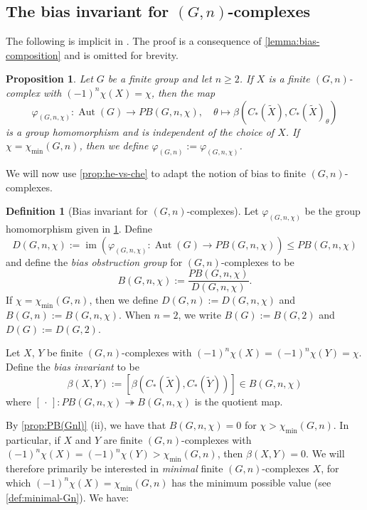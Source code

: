\documentclass[11pt,a4paper,leqno]{amsart}
\newtheorem{proposition}[theorem]{Proposition}
\theoremstyle{definition}
\newtheorem{definition}[theorem]{Definition}
\theoremstyle{remark}
\newcommand{\wt}{\widetilde}
\DeclareMathOperator{\Aut}{Aut}
\DeclareMathOperator{\IM}{im}
\begin{document}
\subsection{The bias invariant for $(G,n)$-complexes} \label{ss:bias-complexes}

The following is implicit in \cite[Definition 1.11]{Latiolais:1993}. 
The proof is a consequence of \cref{lemma:bias-composition} and is omitted for brevity.

\begin{proposition} \label{prop:bias-Aut(G)-action}
Let $G$ be a finite group and let $n \ge 2$. If $X$ is a finite $(G,n)$-complex with $(-1)^n\chi(X) = \chi$, then the map
\[ \varphi_{(G,n,\chi)} \colon  \Aut(G) \to PB(G,n,\chi), \quad \theta \mapsto \beta(C_*(\wt X),C_*(\wt X)_\theta) \]
is a group homomorphism and is independent of the choice of $X$. If $\chi = \chi_{\min}(G,n)$, then we define $\varphi_{(G,n)} := \varphi_{(G,n,\chi)}$.
\end{proposition}

We will now use \cref{prop:he-vs-che} to adapt the notion of bias to finite $(G,n)$-complexes. 

\begin{definition}[Bias invariant for $(G,n)$-complexes]\label{def:bias-original}
Let $\varphi_{(G,n,\chi)}$ be the group homomorphism given in \cref{prop:bias-Aut(G)-action}. Define
\[ D(G,n,\chi) := \IM(\varphi_{(G,n,\chi)}\colon \Aut(G) \to PB(G,n,\chi)) \le PB(G,n,\chi) \] 
and define the \textit{bias obstruction group} for $(G,n)$-complexes to be 
\[B(G,n,\chi) := \frac{PB(G,n,\chi)}{D(G,n,\chi)}. \]
If $\chi = \chi_{\min}(G,n)$, then we define $D(G,n) := D(G,n,\chi)$ and $B(G,n) := B(G,n,\chi)$. When $n=2$, we write $B(G) := B(G,2)$ and $D(G):=D(G,2)$.

Let $X$, $Y$ be finite $(G,n)$-complexes with $(-1)^n\chi(X)=(-1)^n\chi(Y)=\chi$. Define the \textit{bias invariant} to be
\[ \beta(X,Y) := [\beta(C_*(\wt X), C_*(\wt Y))] \in B(G,n,\chi) \]
where $[\, \cdot \, ]\colon PB(G,n,\chi) \twoheadrightarrow B(G,n,\chi)$ is the quotient map. 
\end{definition}

By \cref{prop:PB(Gnl)} (ii), we have that $B(G,n,\chi)=0$ for $\chi  > \chi_{\min}(G,n)$. In particular, if $X$ and $Y$ are finite $(G,n)$-complexes with $(-1)^n\chi(X) = (-1)^n\chi(Y) > \chi_{\min}(G,n)$, then $\beta(X,Y)=0$.
We will therefore primarily be interested in \emph{minimal} finite $(G,n)$-complexes $X$, for which $(-1)^n \chi(X) = \chi_{\min}(G,n)$ has the minimum possible value (see \cref{def:minimal-Gn}). 
We have:
\end{document}
